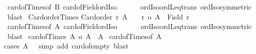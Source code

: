 \begin{isabellebody}
%
\isadelimproof
%
\endisadelimproof
%
\isatagproof
{}\isamarkupfalse%
\ card{\isacharunderscore}{\kern0pt}of{\isacharunderscore}{\kern0pt}Times{}{\isacharbrackleft}{\kern0pt}of\ B{\isacharbrackright}{\kern0pt}\ card{\isacharunderscore}{\kern0pt}of{\isacharunderscore}{\kern0pt}Field{\isacharunderscore}{\kern0pt}ordIso\isanewline
\ \ \ \ \ \ ordIso{\isacharunderscore}{\kern0pt}ordLeq{\isacharunderscore}{\kern0pt}trans\ ordIso{\isacharunderscore}{\kern0pt}symmetric\ \isamarkupfalse%
\ blast%
\endisatagproof
{\isafoldproof}%
%
\isadelimproof
\isanewline
%
\endisadelimproof
\isanewline
{}\isamarkupfalse%
\ Card{\isacharunderscore}{\kern0pt}order{\isacharunderscore}{\kern0pt}Times{}{\isacharcolon}{\kern0pt}\isanewline
{\isachardoublequoteopen}{\isasymlbrakk}Card{\isacharunderscore}{\kern0pt}order\ r{\isacharsemicolon}{\kern0pt}\ A\ {\isasymnoteq}\ {\isacharbraceleft}{\kern0pt}{\isacharbraceright}{\kern0pt}{\isasymrbrakk}\ {\isasymLongrightarrow}\ r\ {\isasymle}o\ {\isacharbar}{\kern0pt}A\ {\isasymtimes}\ {\isacharparenleft}{\kern0pt}Field\ r{\isacharparenright}{\kern0pt}{\isacharbar}{\kern0pt}{\isachardoublequoteclose}\isanewline
%
\isadelimproof
%
\endisadelimproof
%
\isatagproof
{}\isamarkupfalse%
\ card{\isacharunderscore}{\kern0pt}of{\isacharunderscore}{\kern0pt}Times{}{\isacharbrackleft}{\kern0pt}of\ A{\isacharbrackright}{\kern0pt}\ card{\isacharunderscore}{\kern0pt}of{\isacharunderscore}{\kern0pt}Field{\isacharunderscore}{\kern0pt}ordIso\isanewline
\ \ \ \ \ \ ordIso{\isacharunderscore}{\kern0pt}ordLeq{\isacharunderscore}{\kern0pt}trans\ ordIso{\isacharunderscore}{\kern0pt}symmetric\ \isamarkupfalse%
\ blast%
\endisatagproof
{\isafoldproof}%
%
\isadelimproof
\isanewline
%
\endisadelimproof
\isanewline
{}\isamarkupfalse%
\ card{\isacharunderscore}{\kern0pt}of{\isacharunderscore}{\kern0pt}Times{}{\isacharcolon}{\kern0pt}\ {\isachardoublequoteopen}{\isacharbar}{\kern0pt}A{\isacharbar}{\kern0pt}\ {\isasymle}o\ {\isacharbar}{\kern0pt}A\ {\isasymtimes}\ A{\isacharbar}{\kern0pt}{\isachardoublequoteclose}\isanewline
%
\isadelimproof
%
\endisadelimproof
%
\isatagproof
{}\isamarkupfalse%
\ card{\isacharunderscore}{\kern0pt}of{\isacharunderscore}{\kern0pt}Times{}{\isacharbrackleft}{\kern0pt}of\ A{\isacharbrackright}{\kern0pt}\isanewline
{}\isamarkupfalse%
{\isacharparenleft}{\kern0pt}cases\ {\isachardoublequoteopen}A\ {\isacharequal}{\kern0pt}\ {\isacharbraceleft}{\kern0pt}{\isacharbraceright}{\kern0pt}{\isachardoublequoteclose}{\isacharcomma}{\kern0pt}\ simp\ add{\isacharcolon}{\kern0pt}\ card{\isacharunderscore}{\kern0pt}of{\isacharunderscore}{\kern0pt}empty{\isacharcomma}{\kern0pt}\ blast{\isacharparenright}{\kern0pt}%

\end{isabellebody}
